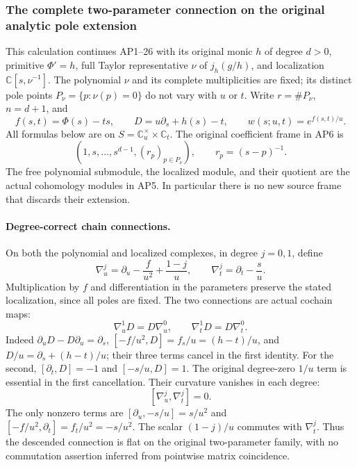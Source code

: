 \subsubsection{The complete two-parameter connection on the original analytic pole extension}
\label{sec:apu-original-connection}

This calculation continues AP1--26 with its original monic \(h\) of
degree \(d>0\), primitive \(\Phi'=h\), full Taylor representative
\(\nu\) of \(j_h(g/h)\), and localization
\(\mathbb C[s,\nu^{-1}]\).  The polynomial \(\nu\) and its complete
multiplicities are fixed; its distinct pole points
\(P_\nu=\{p:\nu(p)=0\}\) do not vary with \(u\) or \(t\).
Write \(r=\#P_\nu\), \(n=d+1\), and
\[
 f(s,t)=\Phi(s)-ts,\qquad
 D=u\partial_s+h(s)-t,\qquad
 w(s;u,t)=e^{f(s,t)/u}.
 \tag{APU1}
\]
All formulas below are on
\(S=\mathbb C^\times_u\times\mathbb C_t\).
The original coefficient frame in AP6 is
\[
 (1,s,\ldots,s^{d-1},(r_p)_{p\in P_\nu}),\qquad
 r_p=(s-p)^{-1}.
 \tag{APU2}
\]
The free polynomial submodule, the localized module, and their
quotient are the actual cohomology modules in AP5.  In particular
there is no new source frame that discards their extension.

\paragraph{Degree-correct chain connections.}
On both the polynomial and localized complexes, in degree \(j=0,1\),
define
\[
 \nabla_u^j=\partial_u-\frac{f}{u^2}+\frac{1-j}{u},
 \qquad
 \nabla_t^j=\partial_t-\frac{s}{u}.
 \tag{APU3}
\]
Multiplication by \(f\) and differentiation in the parameters preserve
the stated localization, since all poles are fixed.  The two
connections are actual cochain maps:
\[
 \nabla_u^1D=D\nabla_u^0,\qquad
 \nabla_t^1D=D\nabla_t^0 .
 \tag{APU4}
\]
Indeed \(\partial_u D-D\partial_u=\partial_s\),
\([{-f/u^2},D]=f_s/u=(h-t)/u\), and
\(D/u=\partial_s+(h-t)/u\); their three terms cancel in the first
identity.  For the second,
\([\partial_t,D]=-1\) and \([{-s/u},D]=1\).
The original degree-zero \(1/u\) term is essential in the first
cancellation.
Their curvature vanishes in each degree:
\[
 [\nabla_u^j,\nabla_t^j]=0.
 \tag{APU5}
\]
The only nonzero terms are
\([\partial_u,-s/u]=s/u^2\) and
\([-f/u^2,\partial_t]=f_t/u^2=-s/u^2\).
The scalar \((1-j)/u\) commutes with \(\nabla_t^j\).
Thus the descended connection is flat on the original
two-parameter family, with no commutation assertion inferred from
pointwise matrix coincidence.

